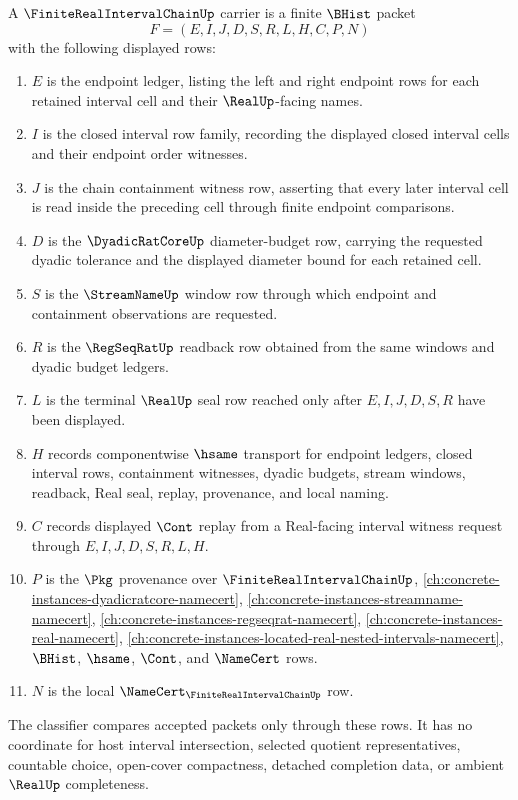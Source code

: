 \begin{definition}
\label{def:finite-real-interval-chain-carrier}
A $\FiniteRealIntervalChainUp$ carrier is a finite $\BHist$ packet
$$
F=(E,I,J,D,S,R,L,H,C,P,N)
$$
with the following displayed rows:
\begin{enumerate}
\item $E$ is the endpoint ledger, listing the left and right endpoint rows for each retained interval cell and their $\RealUp$-facing names.
\item $I$ is the closed interval row family, recording the displayed closed interval cells and their endpoint order witnesses.
\item $J$ is the chain containment witness row, asserting that every later interval cell is read inside the preceding cell through finite endpoint comparisons.
\item $D$ is the $\DyadicRatCoreUp$ diameter-budget row, carrying the requested dyadic tolerance and the displayed diameter bound for each retained cell.
\item $S$ is the $\StreamNameUp$ window row through which endpoint and containment observations are requested.
\item $R$ is the $\RegSeqRatUp$ readback row obtained from the same windows and dyadic budget ledgers.
\item $L$ is the terminal $\RealUp$ seal row reached only after $E,I,J,D,S,R$ have been displayed.
\item $H$ records componentwise $\hsame$ transport for endpoint ledgers, closed interval rows, containment witnesses, dyadic budgets, stream windows, readback, Real seal, replay, provenance, and local naming.
\item $C$ records displayed $\Cont$ replay from a Real-facing interval witness request through $E,I,J,D,S,R,L,H$.
\item $P$ is the $\Pkg$ provenance over $\FiniteRealIntervalChainUp$, \autoref{ch:concrete-instances-dyadicratcore-namecert}, \autoref{ch:concrete-instances-streamname-namecert}, \autoref{ch:concrete-instances-regseqrat-namecert}, \autoref{ch:concrete-instances-real-namecert}, \autoref{ch:concrete-instances-located-real-nested-intervals-namecert}, $\BHist$, $\hsame$, $\Cont$, and $\NameCert$ rows.
\item $N$ is the local $\NameCert_{\FiniteRealIntervalChainUp}$ row.
\end{enumerate}
The classifier compares accepted packets only through these rows. It has no coordinate for host interval intersection, selected quotient representatives, countable choice, open-cover compactness, detached completion data, or ambient $\RealUp$ completeness.
\end{definition}

